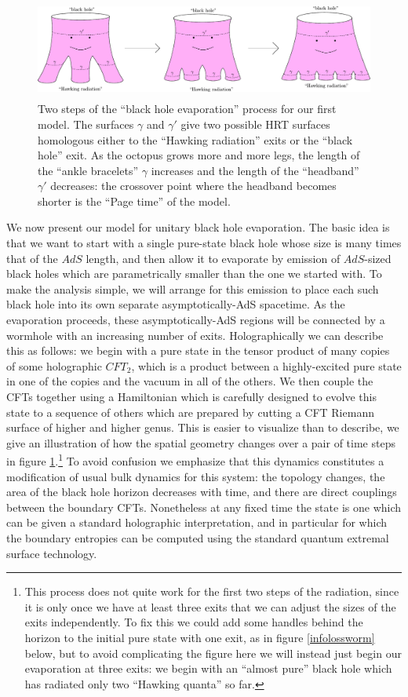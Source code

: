\documentclass[12pt]{article}
\newcommand{\bfig}{\begin{figure}\begin{center}}
\newcommand{\efig}{\end{center}\end{figure}}
\theoremstyle{definition}
\begin{document}
\bfig
\includegraphics[height=3.3cm]{octopi2.pdf}
\caption{Two steps of the ``black hole evaporation'' process for our first model.  The surfaces $\gamma$ and $\gamma'$ give two possible HRT surfaces homologous either to the ``Hawking radiation'' exits or the ``black hole'' exit.  As the octopus grows more and more legs, the length of the ``ankle bracelets'' $\gamma$ increases and the length of the ``headband'' $\gamma'$ decreases: the crossover point where the headband becomes shorter is the ``Page time'' of the model.}\label{octopi} 
\efig
We now present our model for unitary black hole evaporation.  The basic idea is that we want to start with a single pure-state black hole whose size is many times that of the $AdS$ length, and then allow it to evaporate by emission of $AdS$-sized black holes which are parametrically smaller than the one we started with.  To make the analysis simple, we will arrange for this emission to place each such black hole into its own separate asymptotically-AdS spacetime.  As the evaporation proceeds, these asymptotically-AdS regions will be connected by a wormhole with an increasing number of exits.  Holographically we can describe this as follows: we begin with a pure state in the tensor product of many copies of some holographic $CFT_2$, which is a product between a highly-excited pure state in one of the copies and the vacuum in all of the others.  We then couple the CFTs together using a Hamiltonian which is carefully designed to evolve this state to a sequence of others which are prepared by cutting a CFT Riemann surface of higher and higher genus.  This is easier to visualize than to describe, we give an illustration of how the spatial geometry changes over a pair of time steps in figure \ref{octopi}.\footnote{This process does not quite work for the first two steps of the radiation, since it is only once we have at least three exits that we can adjust the sizes of the exits independently.  To fix this we could add some handles behind the horizon to the initial pure state with one exit, as in figure \ref{infolossworm} below, but to avoid complicating the figure here we will instead just begin our evaporation at three exits: we begin with an ``almost pure'' black hole which has radiated only two ``Hawking quanta'' so far.} To avoid confusion we emphasize that this dynamics constitutes a modification of usual bulk dynamics for this system: the topology changes, the area of the black hole horizon decreases with time, and there are direct couplings between the boundary CFTs.  Nonetheless at any fixed time the state is one which can be given a standard holographic interpretation, and in particular for which the boundary entropies can be computed using the standard quantum extremal surface technology.
\end{document}
